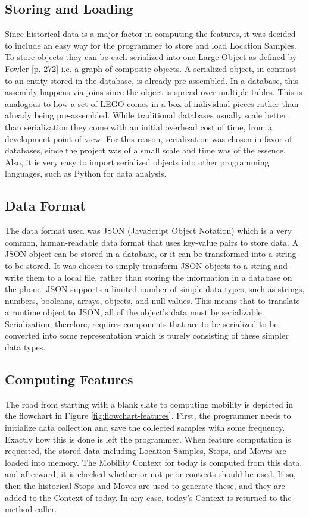 \subsection{Storing and Loading}
Since historical data is a major factor in computing the features, it was decided to include an easy way for the programmer to store and load Location Samples. To store objects they can be each serialized into one Large Object as defined by Fowler \cite{fowler-PEEA} [p. 272] i.e. a graph of composite objects. A serialized object, in contrast to an entity stored in the database, is already pre-assembled. In a database, this assembly happens via joins since the object is spread over multiple tables. This is analogous to how a set of LEGO comes in a box of individual pieces rather than already being pre-assembled. While traditional databases usually scale better than serialization they come with an initial overhead cost of time, from a development point of view. For this reason, serialization was chosen in favor of databases,  since the project was of a small scale and time was of the essence. Also, it is very easy to import serialized objects into other programming languages, such as Python for data analysis. 

\subsection{Data Format}
The data format used was JSON (JavaScript Object Notation) which is a very common, human-readable data format that uses key-value pairs to store data. A JSON object can be stored in a database, or it can be transformed into a string to be stored. It was chosen to simply transform JSON objects to a string and write them to a local file, rather than storing the information in a database on the phone. JSON supports a limited number of simple data types, such as strings, numbers, booleans, arrays, objects, and null values. This means that to translate a runtime object to JSON, all of the object's data must be serializable. Serialization, therefore, requires components that are to be serialized to be converted into some representation which is purely consisting of these simpler data types.

\subsection{Computing Features}
The road from starting with a blank slate to computing mobility is depicted in the flowchart in Figure \ref{fig:flowchart-features}. First, the programmer needs to initialize data collection and save the collected samples with some frequency. Exactly how this is done is left the programmer. When feature computation is requested, the stored data including Location Samples, Stops, and Moves are loaded into memory. The Mobility Context for today is computed from this data, and afterward, it is checked whether or not prior contexts should be used. If so, then the historical Stops and Moves are used to generate these, and they are added to the Context of today. In any case, today's Context is returned to the method caller.

